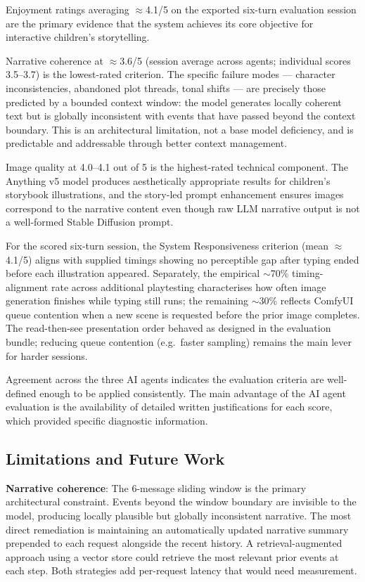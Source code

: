 \documentclass[12pt,a4paper]{article}
\begin{document}
Enjoyment ratings averaging $\approx$4.1/5 on the exported six-turn evaluation session are the primary evidence that the system achieves its core objective for interactive children's storytelling.

Narrative coherence at $\approx$3.6/5 (session average across agents; individual scores 3.5--3.7) is the lowest-rated criterion. The specific failure modes --- character inconsistencies, abandoned plot threads, tonal shifts --- are precisely those predicted by a bounded context window: the model generates locally coherent text but is globally inconsistent with events that have passed beyond the context boundary. This is an architectural limitation, not a base model deficiency, and is predictable and addressable through better context management.

Image quality at 4.0--4.1 out of 5 is the highest-rated technical component. The Anything v5 model produces aesthetically appropriate results for children's storybook illustrations, and the story-led prompt enhancement ensures images correspond to the narrative content even though raw LLM narrative output is not a well-formed Stable Diffusion prompt.

For the scored six-turn session, the System Responsiveness criterion (mean $\approx$4.1/5) aligns with supplied timings showing no perceptible gap after typing ended before each illustration appeared. Separately, the empirical $\sim$70\% timing-alignment rate across additional playtesting characterises how often image generation finishes while typing still runs; the remaining $\sim$30\% reflects ComfyUI queue contention when a new scene is requested before the prior image completes. The read-then-see presentation order behaved as designed in the evaluation bundle; reducing queue contention (e.g.\ faster sampling) remains the main lever for harder sessions.

Agreement across the three AI agents indicates the evaluation criteria are well-defined enough to be applied consistently. The main advantage of the AI agent evaluation is the availability of detailed written justifications for each score, which provided specific diagnostic information.

    \subsection{Limitations and Future Work}

\textbf{Narrative coherence}: The 6-message sliding window is the primary architectural constraint. Events beyond the window boundary are invisible to the model, producing locally plausible but globally inconsistent narrative. The most direct remediation is maintaining an automatically updated narrative summary prepended to each request alongside the recent history. A retrieval-augmented approach using a vector store could retrieve the most relevant prior events at each step. Both strategies add per-request latency that would need measurement.
\end{document}
